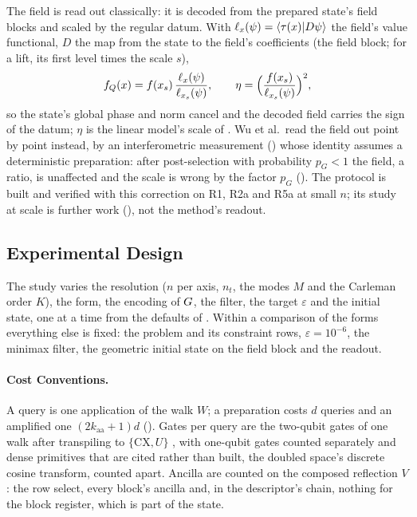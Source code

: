 The field is read out classically: it is decoded from the prepared state's field blocks and scaled by the regular datum. With $\ell_x(\psi)=\braket{\tau(x)|D\psi}$ the field's value functional, $D$ the map from the state to the field's coefficients (the field block; for a lift, its first level times the scale $s$),
\begin{equation}
    f_Q(x)=f(x_s)\,\frac{\ell_x(\psi)}{\ell_{x_s}(\psi)},
    \qquad
    \eta=\Bigl(\frac{f(x_s)}{\ell_{x_s}(\psi)}\Bigr)^{2},
    \label{eq:readout-field}
\end{equation}
so the state's global phase and norm cancel and the decoded field carries the sign of the datum; $\eta$ is the linear model's scale of . Wu et al.\ read the field out point by point instead, by an interferometric measurement () whose identity assumes a deterministic preparation: after post-selection with probability $p_G<1$ the field, a ratio, is unaffected and the scale is wrong by the factor $p_G$ (). The protocol is built and verified with this correction on R1, R2a and R5a at small $n$; its study at scale is further work (), not the method's readout.

\subsection{Experimental Design}
\label{sec:pipeline-design}

The study varies the resolution ($n$ per axis, $n_t$, the modes $M$ and the Carleman order $K$), the form, the encoding of $G$, the filter, the target $\varepsilon$ and the initial state, one at a time from the defaults of . Within a comparison of the forms everything else is fixed: the problem and its constraint rows, $\varepsilon=10^{-6}$, the minimax filter, the geometric initial state on the field block and the readout.

\paragraph{Cost Conventions.} A query is one application of the walk $W$; a preparation costs $d$ queries and an amplified one $(2k_{\mathrm{aa}}+1)d$ (). Gates per query are the two-qubit gates of one walk after transpiling to $\{\mathrm{CX},U\}$ \cite{qiskit2024}, with one-qubit gates counted separately and dense primitives that are cited rather than built, the doubled space's discrete cosine transform, counted apart. Ancilla are counted on the composed reflection $V$: the row select, every block's ancilla and, in the descriptor's chain, nothing for the block register, which is part of the state.

